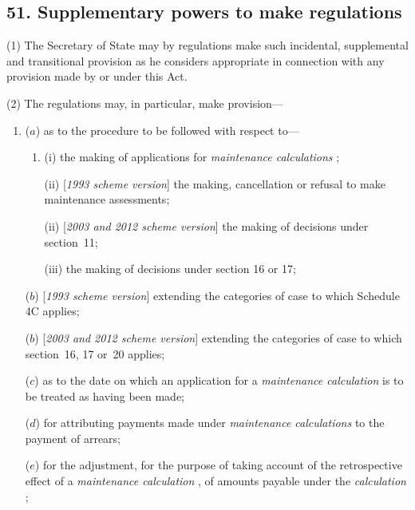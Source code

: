 \documentclass[12pt,a4paper]{article}
\begin{document}
\subsection{51. Supplementary powers to make regulations}

(1) The Secretary of State may by regulations make such incidental, supplemental and transitional provision as he considers appropriate in connection with any provision made by or under this Act.

(2) The regulations may, in particular, make provision—
\begin{enumerate}\item[]
($a$) as to the procedure to be followed with respect to—
\begin{enumerate}\item[]
(i) the making of applications for 
\emph{maintenance calculations}%
;

(ii) [\emph{1993 scheme version}] the making, cancellation or refusal to make maintenance assessments;

(ii) [\emph{2003 and 2012 scheme version}] the making of decisions under section~11;


(iii) the making of decisions under section 16 or 17;
\end{enumerate}

($b$) [\emph{1993 scheme version}] extending the categories of case to which 
Schedule 4C  %
applies;

($b$) [\emph{2003 and 2012 scheme version}] extending the categories of case to which section~16, 17 or~20 applies;

($c$) as to the date on which an application for a 
\emph{maintenance calculation}  %
is to be treated as having been made;

($d$) for attributing payments made under 
\emph{maintenance calculations}  %
to the payment of arrears;

($e$) for the adjustment, for the purpose of taking account of the retrospective effect of a 
\emph{maintenance calculation}%
, of amounts payable under the 
\emph{calculation}%
;


\end{enumerate}
\end{document}
